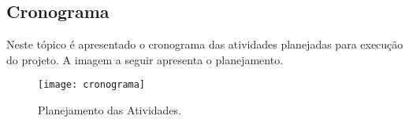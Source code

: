 \begin{landscape}
\chapter[Cronograma]{Cronograma}
\label{chap:cronograma}
	
	Neste tópico é apresentado o cronograma das atividades planejadas para execução do projeto. A imagem a seguir apresenta o planejamento.

	\begin{figure}[h]
		\centering
		\texttt{[image: cronograma]}
		\caption{Planejamento das Atividades.}
		\label{fig:cronograma}
	\end{figure}


\end{landscape}
